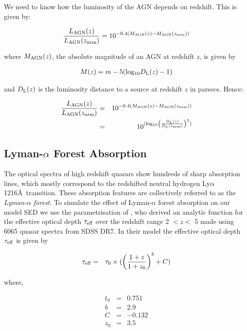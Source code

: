 We need to know how the luminosity of the AGN depends on redshift. 
This is given by:

\begin{eqnarray}
  \frac{L_{\rm AGN}(z)}{L_{\rm AGN}(z_{\rm nrm})} = 10^{-0.4(M_{\rm AGN}(z)-M_{\rm AGN}(z_{\rm nrm}))}
\end{eqnarray}

where $M_{\rm AGN}(z)$, the absolute magnitude of an AGN at redshift $z$, is given by

\begin{eqnarray}
  M(z) = m - 5({\rm log_{10}}D_{\rm L}(z) - 1)
\end{eqnarray}

and $D_{\rm L}(z)$ is the luminosity distance to a source at redshift $z$ in parsecs. 
Hence:

\begin{eqnarray}
  \frac{L_{\rm AGN}(z)}{L_{\rm AGN}(z_{\rm nrm})} & = & 10^{-0.4(M_{\rm AGN}(z)-M_{\rm AGN}(z_{\rm nrm}))} \\
  & = & 10^{({\rm log_{10}} \left( \frac{D_{\rm L}(z)}{D_{\rm L}(z_{\rm nrm})} \right)^2 )}
\end{eqnarray}
 

\subsection{Lyman-$\alpha$ Forest Absorption}

The optical spectra of high redshift quasars show hundreds of sharp absorption lines, which mostly correspond to the redshifted neutral hydrogen Ly$\alpha$ 1216\AA~transition. 
These absorption features are collectively referred to as the {\it Lyman-$\alpha$ forest}. 
To simulate the effect of Lyman-$\alpha$ forest absorption on our model SED we use the parametrisation of \citet{becker13}, who derived an analytic function for the effective optical depth $\tau_{\rm eff}$ over the redshift range 2 $< z <$ 5 made using 6065 quasar spectra from SDSS DR7. 
In their model the effective optical depth $\tau_{\rm eff}$ is given by 

\begin{eqnarray}
  \label{eq:taueff}
  \tau_{\rm eff} & = & \tau_0 \times ( \left( \frac{ 1 + z }{ 1 + z_0 } \right)^b + C )
\end{eqnarray}

where,

\begin{eqnarray*}
  t_0 & = & 0.751 \\
  b & = & 2.9 \\
  C & = & -0.132 \\
  z_0 & = & 3.5 
\end{eqnarray*}

